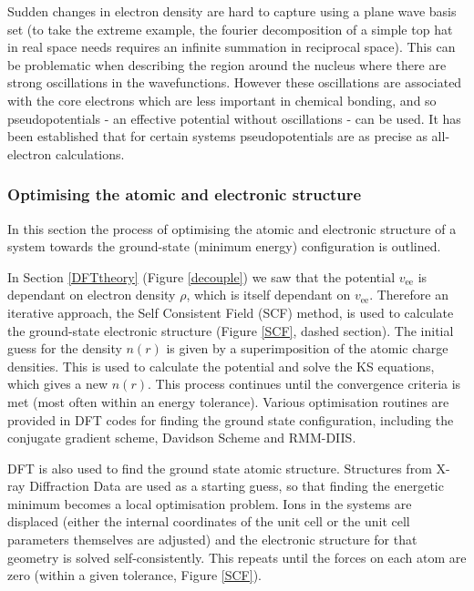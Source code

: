 Sudden changes in electron density are hard to capture using a plane wave basis set (to take the extreme example, the fourier decomposition of a simple top hat in real space needs requires an infinite summation in reciprocal space). This can be problematic when describing the region around the nucleus where there are strong oscillations in the wavefunctions. However these oscillations are associated with the core electrons which are less important in chemical bonding, and so pseudopotentials - an effective potential without oscillations - can be used. It has been established that for certain systems pseudopotentials are as precise as all-electron calculations.\autocite{Lejaeghere2016a}

\subsubsection{Optimising the atomic and electronic structure}

In this section the process of optimising the atomic and electronic structure of a system towards the ground-state (minimum energy) configuration is outlined. 

In Section \ref{DFTtheory} (Figure \ref{decouple}) we saw that the potential $v_\textrm{ee}$ is dependant on electron density $\rho$, which is itself dependant on $v_\textrm{ee
}$. Therefore an iterative approach, the Self Consistent Field (SCF) method, is used to calculate the ground-state electronic structure (Figure \ref{SCF}, dashed section). The initial guess for the density $n(r)$ is given by a superimposition of the atomic charge densities. This is used to calculate the potential and solve the KS equations, which gives a new $n(r)$. This process continues until the convergence criteria is met (most often within an energy tolerance). Various optimisation routines are provided in DFT codes for finding the ground state configuration, including the conjugate gradient scheme, Davidson Scheme and RMM-DIIS.

DFT is also used to find the ground state atomic structure. Structures from X-ray Diffraction Data are used as a starting guess, so that finding the energetic minimum becomes a local optimisation problem. Ions in the systems are displaced (either the internal coordinates of the unit cell or the unit cell parameters themselves are adjusted) and the electronic structure for that geometry is solved self-consistently. This repeats until the forces on each atom are zero (within a given tolerance, Figure \ref{SCF}). 


